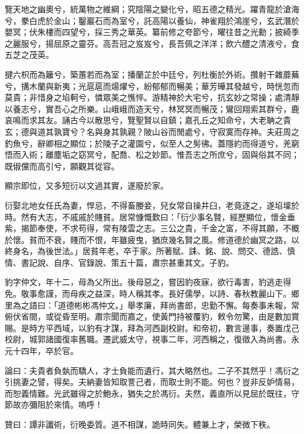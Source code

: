 \begin{pinyinscope}
覽天地之幽奧兮，統萬物之維綱；究陰陽之變化兮，昭五德之精光。躍青龍於滄海兮，豢白虎於金山；鑿巖石而為室兮，託高陽以養仙，神雀翔於鴻崖兮，玄武潛於嬰冥；伏朱樓而四望兮，採三秀之華英。纂前修之夸節兮，曜往昔之光勳；披綺季之麗服兮，揚屈原之靈芬。高吾冠之岌岌兮，長吾佩之洋洋；飲六醴之清液兮，食五芝之茂英。

揵六枳而為籬兮，築蕙若而為室；播蘭芷於中廷兮，列杜衡於外術。攢射干雜蘼蕪兮，搆木蘭與新夷；光扈扈而煬燿兮，紛郁郁而暢美；華芳曄其發越兮，時恍忽而莫貴；非惜身之埳軻兮，憐眾美之憔悴。游精神於大宅兮，抗玄妙之常操；處清靜以養志兮，實吾心之所樂。山峨峨而造天兮，林冥冥而暢茂；鸞回翔索其群兮，鹿哀鳴而求其友。誦古今以散思兮，覽聖賢以自鎮；嘉孔丘之知命兮，大老聃之貴玄；德與道其孰寶兮？名與身其孰親？陂山谷而閒處兮，守寂寞而存神。夫莊周之釣魚兮，辭卿相之顯位；於陵子之灌園兮，似至人之髣彿。蓋隱約而得道兮，羌窮悟而入術；離塵垢之窈冥兮，配喬、松之妙節。惟吾志之所庶兮，固與俗其不同；既俶儻而高引兮，願觀其從容。

顯宗即位，又多短衍以文過其實，遂廢於家。

衍娶北地女任氏為妻，悍忌，不得畜媵妾，兒女常自操井臼，老竟逐之，遂埳壈於時。然有大志，不戚戚於賤貧。居常慷慨歎曰：「衍少事名賢，經歷顯位，懷金垂紫，揭節奉使，不求苟得，常有陵雲之志。三公之貴，千金之富，不得其願，不概於懷。貧而不衰，賤而不恨，年雖疲曳，猶庶幾名賢之風。修道德於幽冥之路，以終身名，為後世法。」居貧年老，卒于家。所著賦、誄、銘、說、問交、德誥、慎情、書記說、自序、官錄說、策五十篇，肅宗甚重其文。子豹。

豹字仲文，年十二，母為父所出。後母惡之，嘗因豹夜寐，欲行毒害，豹逃走得免。敬事愈謹，而母疾之益深，時人稱其孝。長好儒學，以詩、春秋教麗山下。鄉里為之語曰：「道德彬彬馮仲文。」舉孝廉，拜尚書郎，忠勤不懈。每奏事未報，常俯伏省閤，或從昏至明。肅宗聞而嘉之，使黃門持被覆豹，敕令勿驚，由是數加賞賜。是時方平西域，以豹有才謀，拜為河西副校尉。和帝初，數言邊事，奏置戊己校尉，城郭諸國復率舊職。遷武威太守，視事二年，河西稱之，復徵入為尚書。永元十四年，卒於官。

論曰：夫貴者負埶而驕人，才士負能而遺行，其大略然也。二子不其然乎！馮衍之引挑妻之譬，得矣。夫納妻皆知取詈己者，而取士則不能。何也？豈非反妒情易，而恕義情難。光武雖得之於鮑永，猶失之於馮衍。夫然，義直所以見屈於既往，守節故亦彌阻於來情。嗚呼！

贊曰：譚非讖術，衍晚委質。道不相謀，詭時同失。體兼上才，榮微下秩。


\end{pinyinscope}
